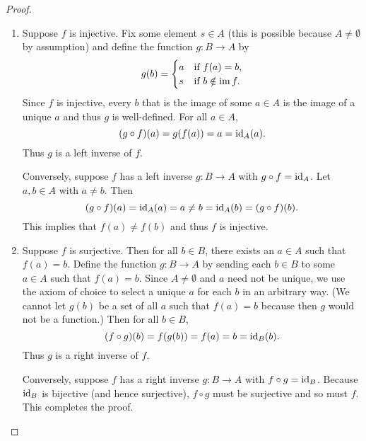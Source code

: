 \begin{proof}\(\)

    \begin{enumerate}[label=(\alph*), wide]
        \item Suppose \(f\) is injective. Fix some element \(s \in A\) (this is
        possible because \(A \neq \emptyset\) by assumption) and define the
        function \(g : B \to A\) by
        \[
            g(b) = \begin{cases}
                a & \text{if } f(a) = b, \\
                s & \text{if } b \notin \operatorname{im} f.
            \end{cases}
        \]
        Since \(f\) is injective, every \(b\) that is the image of some \(a \in
        A\) is the image of a unique \(a\) and thus \(g\) is well-defined. For
        all \(a \in A\),
        \[
            (g \circ f)(a) = g(f(a)) = a = \operatorname{id}_A(a).
        \]
        Thus \(g\) is a left inverse of \(f\).

        Conversely, suppose \(f\) has a left inverse \(g : B \to A\) with \(g
        \circ f = \operatorname{id}_A\). Let \(a, b \in A\) with \(a \neq b\). Then
        \[
            (g \circ f)(a) = \operatorname{id}_A(a) = a \neq b = \operatorname{id}_A(b) = (g \circ f)(b).
        \]
        This implies that \(f(a) \neq f(b)\) and thus \(f\) is injective.

        \item Suppose \(f\) is surjective. Then for all \(b \in B\), there
        exists an \(a \in A\) such that \(f(a) = b\). Define the function \(g :
        B \to A\) by sending each \(b \in B\) to some \(a \in A\) such that
        \(f(a) = b\). Since \(A \neq \emptyset\) and \(a\) need not be unique,
        we use the axiom of choice to select a unique \(a\) for each \(b\) in an
        arbitrary way. (We cannot let \(g(b)\) be a set of all \(a\) such that
        \(f(a) = b\) because then \(g\) would not be a function.) Then for all
        \(b \in B\),
        \[
            (f \circ g)(b) = f(g(b)) = f(a) = b = \operatorname{id}_B(b).
        \]
        Thus \(g\) is a right inverse of \(f\).

        Conversely, suppose \(f\) has a right inverse \(g : B \to A\) with \(f
        \circ g = \operatorname{id}_B\). Because \(\operatorname{id}_B\) is bijective (and hence
        surjective), \(f \circ g\) must be surjective and so must \(f\). This
        completes the proof.
    \end{enumerate}
\end{proof}

